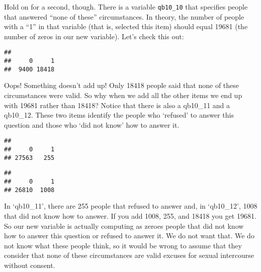 \documentclass[
]{book}
\newenvironment{Shaded}{\begin{snugshade}}{\end{snugshade}}
\newcommand{\FunctionTok}[1]{\textcolor[rgb]{0.13,0.29,0.53}{\textbf{#1}}}
\newcommand{\NormalTok}[1]{#1}
\newcommand{\SpecialCharTok}[1]{\textcolor[rgb]{0.81,0.36,0.00}{\textbf{#1}}}
\begin{document}
Hold on for a second, though. There is a variable \texttt{qb10\_10} that specifies people that answered ``none of these'' circumstances. In theory, the number of people with a ``1'' in that variable (that is, selected this item) should equal 19681 (the number of zeros in our new variable). Let's check this out:

\begin{Shaded}
\end{Shaded}

\begin{verbatim}
## 
##     0     1 
##  9400 18418
\end{verbatim}

Oops! Something doesn't add up! Only 18418 people said that none of these circumstances were valid. So why when we add all the other items we end up with 19681 rather than 18418? Notice that there is also a qb10\_11 and a qb10\_12. These two items identify the people who `refused' to answer this question and those who `did not know' how to answer it.

\begin{Shaded}
\end{Shaded}

\begin{verbatim}
## 
##     0     1 
## 27563   255
\end{verbatim}

\begin{Shaded}
\end{Shaded}

\begin{verbatim}
## 
##     0     1 
## 26810  1008
\end{verbatim}

In `qb10\_11', there are 255 people that refused to answer and, in `qb10\_12', 1008 that did not know how to answer. If you add 1008, 255, and 18418 you get 19681. So our new variable is actually computing as zeroes people that did not know how to answer this question or refused to answer it. We do not want that. We do not know what these people think, so it would be wrong to assume that they consider that none of these circumstances are valid excuses for sexual intercourse without consent.
\end{document}
